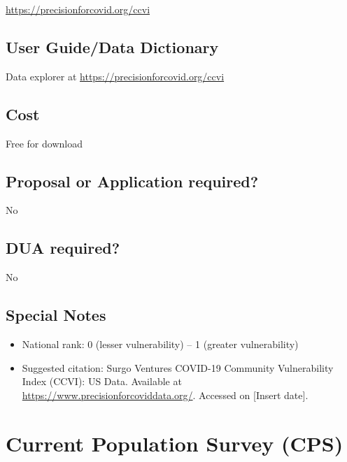 \documentclass[
]{book}
\providecommand{\tightlist}{%
  \setlength{\itemsep}{0pt}\setlength{\parskip}{0pt}}
\begin{document}
\url{https://precisionforcovid.org/ccvi}

\hypertarget{user-guidedata-dictionary-21}{%
\section{User Guide/Data Dictionary}\label{user-guidedata-dictionary-21}}

Data explorer at \url{https://precisionforcovid.org/ccvi}

\hypertarget{cost-21}{%
\section{Cost}\label{cost-21}}

Free for download

\hypertarget{proposal-or-application-required-21}{%
\section{Proposal or Application required?}\label{proposal-or-application-required-21}}

No

\hypertarget{dua-required-21}{%
\section{DUA required?}\label{dua-required-21}}

No

\hypertarget{special-notes-21}{%
\section{Special Notes}\label{special-notes-21}}

\begin{itemize}
\tightlist
\item
  National rank: 0 (lesser vulnerability) -- 1 (greater vulnerability)
\item
  Suggested citation: Surgo Ventures COVID-19 Community Vulnerability Index (CCVI): US Data. Available at \url{https://www.precisionforcoviddata.org/}. Accessed on {[}Insert date{]}.
\end{itemize}

\mainmatter

\hypertarget{current-population-survey-cps}{%
\chapter{Current Population Survey (CPS)}\label{current-population-survey-cps}}
\end{document}
